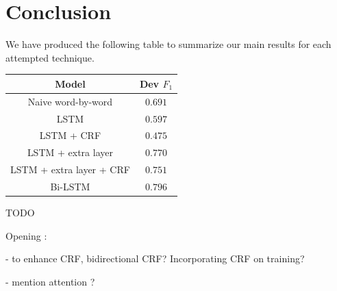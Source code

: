 \documentclass{article} %
\begin{document}
\section{Conclusion}

We have produced the following table to summarize our main results for each attempted technique.

\begin{center}
 \begin{tabular}{||c | c||}
 \hline
 Model  & Dev $F_1$ \\
 \hline\hline
 Naive word-by-word & $0.691$ \\
 \hline
 LSTM & $0.597$ \\
 \hline
 LSTM + CRF & $0.475$ \\
 \hline
 LSTM + extra layer & $0.770$ \\
 \hline
 LSTM + extra layer + CRF & $0.751$ \\
 \hline
 Bi-LSTM & $0.796$ \\ %
 \hline
\end{tabular}
\end{center}

TODO

Opening :

- to enhance CRF, bidirectional CRF? Incorporating CRF on training?

- mention attention ?


\newpage


\end{document}
